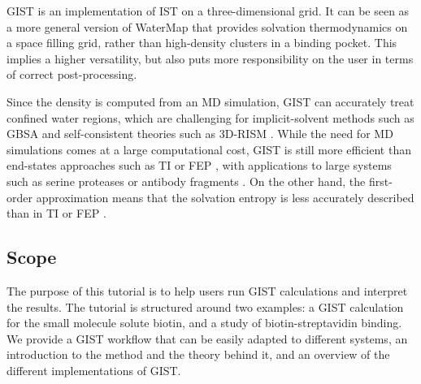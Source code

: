 \documentclass[9pt,tutorial]{livecoms}
\begin{document}
GIST is an implementation of IST on a three-dimensional grid. It can be seen as a more general version of WaterMap \cite{Abel2008-watermap,Young2007-watermap} that provides solvation thermodynamics on a space filling grid, rather than high-density clusters in a binding pocket.
This implies a higher versatility, but also puts more responsibility on the user in terms of correct post-processing.

Since the density is computed from an MD simulation, GIST can accurately treat confined water regions, which are challenging for implicit-solvent methods such as GBSA and self-consistent theories such as 3D-RISM \cite{Kovalenko1998-3drism}.
While the need for MD simulations comes at a large computational cost, GIST is still more efficient than end-states approaches such as TI \cite{Kirkwood1935-ti} or FEP \cite{Zwanzig1954-reweighting}, with applications to large systems such as serine proteases \cite{Kraml2019-gigist} or antibody fragments \cite{Waibl2021-gist-antibodies}.
On the other hand, the first-order approximation means that the solvation entropy is less accurately described than in TI or FEP \cite{Chen2021,Waibl2021-gist-salt}.
%
%
%

\subsection{Scope}
The purpose of this tutorial is to help users run GIST calculations and interpret the results.
The tutorial is structured around two examples: a GIST calculation for the small molecule solute biotin, and a study of biotin-streptavidin binding.
We provide a GIST workflow that can be easily adapted to different systems, an introduction to the method and the theory behind it, and an overview of the different implementations of GIST.
\end{document}
